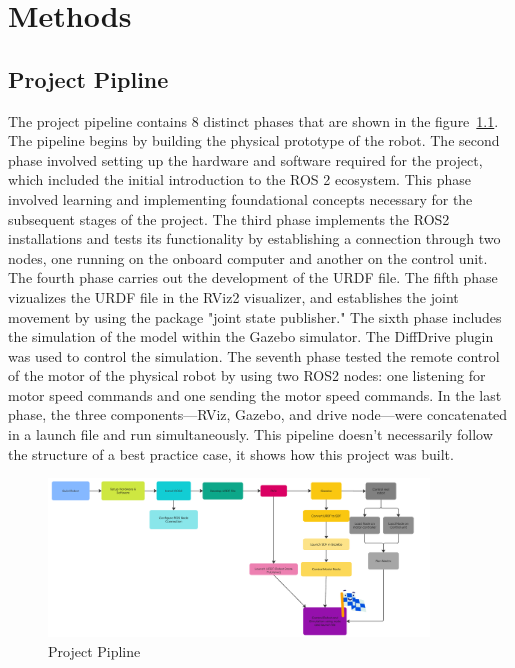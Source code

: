 \chapter{Methods}

\section{Project Pipline}

The project pipeline contains 8 distinct phases that are shown in the figure~\ref{fig:pipline}. 
The pipeline begins by building the physical prototype of the robot. 
The second phase involved setting up the hardware and software required for the project, which included the initial introduction to the ROS 2 ecosystem. This phase involved learning and implementing foundational concepts necessary for the subsequent stages of the project. 
The third phase implements the ROS2 installations and tests its functionality by establishing a connection through two nodes, one running on the onboard computer and another on the control unit. 
The fourth phase carries out the development of the URDF file. 
The fifth phase vizualizes the URDF file in the RViz2 visualizer, and establishes the joint movement by using the package "joint state publisher." 
The sixth phase includes the simulation of the model within the Gazebo simulator. The DiffDrive plugin was used to control the simulation.
The seventh phase tested the remote control of the motor of the physical robot by using two ROS2 nodes: one listening for motor speed commands and one sending the motor speed commands. In the last phase, the three components—RViz, Gazebo, and drive node—were concatenated in a launch file and run simultaneously. 
This pipeline doesn't necessarily follow the structure of a best practice case, it shows how this project was built. 

\begin{figure}[h]
    \centering
    \includegraphics[width=0.9\textwidth]{Figures/project_pipline.png}
    \caption{Project Pipline}
    \label{fig:pipline}
\end{figure}
\autocite{openroboticsUrdfROSWiki}

